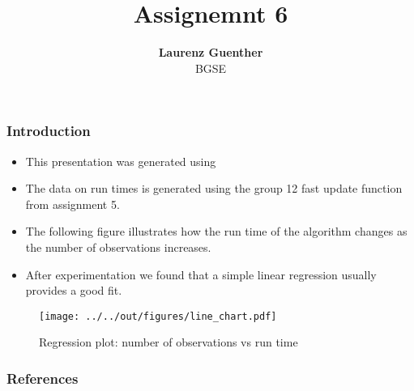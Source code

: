 \documentclass[11pt]{beamer}
\begin{document}
	
	\title{Assignemnt 6}
	
	\author[Laurenz Guenther]
	{
		{\bf Laurenz Guenther}\\
		{\small BGSE}\\[1ex]
	}
	
	
	\begin{frame}
	\titlepage
	\note{~}
\end{frame}


\begin{frame}[t]
\frametitle{Introduction}
\begin{itemize}
	\item<+-> This presentation was generated using \citet{GaudeckerEconProjectTemplates}
	\item<+-> The data on run times is generated using the group 12 fast update function from assignment 5.
	\item The following figure illustrates how the run time of the algorithm changes as the number of observations increases.
	\item After experimentation we found that a simple linear regression usually provides a good fit.
\end{itemize}
\note{~}
\end{frame}



\begin{frame}
	\begin{figure}
		\caption{Regression plot: number of observations vs run time}		
		\texttt{[image: ../../out/figures/line\_chart.pdf]}	
	\end{figure}
\end{frame}




 {
\begin{frame}
\frametitle{}
\end{frame}

}

\begin{frame}[allowframebreaks]
\frametitle{References}

\renewcommand{\bibfont}{\normalfont\footnotesize}
\printbibliography


\end{frame}
\end{document}
